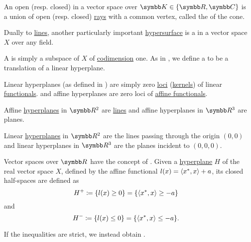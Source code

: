 \begin{definition}\label{def:geometric_cone}
  An open (resp. closed)  in a vector space over \( \BK \in \{ \BR, \BC \} \) is a union of open (resp. closed) \hyperref[def:geometric_ray]{rays} with a common vertex, called the  of the cone.
\end{definition}

\begin{definition}\label{def:hyperplane}
  Dually to \hyperref[def:geometric_line]{lines}, another particularly important \hyperref[def:hypersurface]{hypersurface} is a  in a vector space \( X \) over any field.

  \begin{defenum}
     A  is simply a subspace of \( X \) of \hyperref[def:vector_space_dimension]{codimension} one. As in , we define a  to be a translation of a linear hyperplane.

     Linear hyperplanes (as defined in ) are simply zero \hyperref[def:zero_locus]{loci} (\hyperref[def:semiring_kernel]{kernels}) of linear \hyperref[def:linear_operator]{functionals}. and affine hyperplanes are zero loci of \hyperref[def:affine_operator]{affine functionals}.
  \end{defenum}
\end{definition}

\begin{example}\label{ex:hyperplanes}
  Affine \hyperref[def:hyperplane]{hyperplanes} in \( \BR^2 \) are \hyperref[def:geometric_line]{lines} and affine hyperplanes in \( \BR^3 \) are planes.

  Linear \hyperref[def:hyperplane]{hyperplanes} in \( \BR^2 \) are the lines passing through the origin \( (0, 0) \) and linear hyperplanes in \( \BR^3 \) are the planes incident to \( (0, 0, 0) \).
\end{example}

\begin{definition}\label{def:half_space}
  Vector spaces over \( \BR \) have the concept of . Given a \hyperref[def:hyperplane]{hyperplane} \( H \) of the real vector space \( X \), defined by the affine functional \( l(x) = \left\langle x^*, x \right\rangle + a \), its closed half-spaces are defined as
  \begin{equation*}
    H^+ \coloneqq \{ l(x) \geq 0 \} = \{ \left\langle x^*, x \right\rangle \geq -a \}
  \end{equation*}
  and
  \begin{equation*}
    H^- \coloneqq \{ l(x) \leq 0 \} = \{ \left\langle x^*, x \right\rangle \leq -a \}.
  \end{equation*}

  If the inequalities are strict, we instead obtain .
\end{definition}

